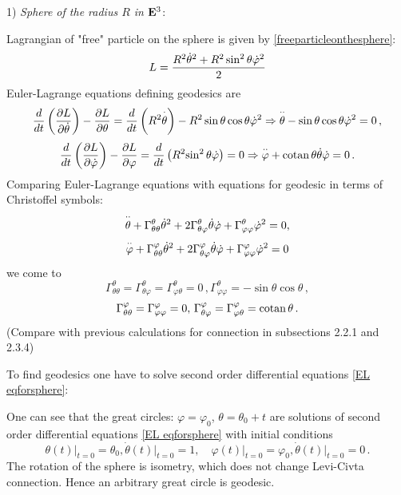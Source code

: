 \documentclass[12pt]{article}
\theoremstyle{theorem}
\numberwithin{equation}{section}
\begin{document}
{1) {\it Sphere of the radius $R$ in ${\bf E}^3$}:


   Lagrangian of "free" particle on the sphere is given by \eqref{freeparticleonthesphere}:
    $$
    L={R^2\dot \theta^2+R^2\sin^2\theta\dot \varphi^2\over 2}
    $$
Euler-Lagrange equations defining geodesics are
          \begin{equation}\label{EL eqforsphere}
  {d\over dt}\left({\p L\over \p  \dot\theta}\right)-
  {\p L\over \p \theta}=
  {d\over dt} \left(R^2{\buildrel \cdot\over \theta}\right)-
  R^2\sin\theta\cos\theta\dot \varphi^2\Rightarrow  {\buildrel \cdot\cdot\over \theta}-
  \sin\theta\cos\theta\dot \varphi^2=0\,,
          \end{equation}
              $$
{d\over dt}\left({\p L\over \p  \dot\varphi}\right)-
  {\p L\over \p \varphi}=
  {d\over dt} \left(R^2{\sin^2\theta\dot\varphi}\right)=0\Rightarrow
  {\buildrel \cdot\cdot\over \varphi}+
  {\rm cotan\,}\theta\dot\theta\dot\varphi=0\,.
                            $$
Comparing Euler-Lagrange equations with equations for geodesic in terms of Christoffel symbols:
         $$
   {\buildrel \cdot\cdot\over \theta}+\Gamma^\theta_{\theta\theta}\dot\theta^2+
   2\Gamma^\theta_{\theta\varphi}\dot\theta\dot\varphi+\Gamma^\theta_{\varphi\varphi}\dot\varphi^2=0,
         $$
    $$
  {\buildrel \cdot\cdot\over \varphi}+\Gamma^\varphi_{\theta\theta}\dot\theta^2+
   2\Gamma^\varphi_{\theta\varphi}\dot\theta\dot\varphi+\Gamma^\varphi_{\varphi\varphi}\dot\varphi^2=0
    $$
    we come to
 \begin{equation}\label{christsymbolsthroughlagrangiansforsphere1}
    \Gamma^\theta_{\theta\theta}=
    \Gamma^\theta_{\theta\varphi}=\Gamma^\theta_{\varphi\theta}=0\,,
    \Gamma^\theta_{\varphi\varphi}=-\sin\theta\cos\theta\,,
 \end{equation}
 \begin{equation}\label{christsymbolsthroughlagrangiansforsphere2}
    \Gamma^\varphi_{\theta\theta}=\Gamma^\varphi_{\varphi\varphi}=0,\,
    \Gamma^\varphi_{\theta\varphi}=\Gamma^\varphi_{\varphi\theta}={\rm cotan\, }\theta\,.
 \end{equation}
 (Compare with previous calculations for connection in subsections 2.2.1 and 2.3.4)


To find geodesics one have to solve second order differential equations \eqref{EL eqforsphere}:

One can see that the great circles: $\varphi=\varphi_0$, $\theta=\theta_0+t$ are solutions of
second order differential equations \eqref{EL eqforsphere} with initial conditions
\begin{equation}\label{initialconditions}
  \theta(t)\big\vert_{t=0}=\theta_0, \dot\theta(t)\big\vert_{t=0}=1,\quad
  \varphi(t)\big\vert_{t=0}=\varphi_0, \dot\theta(t)\big\vert_{t=0}=0\,.
\end{equation}
The rotation of the sphere is isometry, which does not change Levi-Civta connection.
Hence an arbitrary great circle is geodesic.

}
\end{document}
